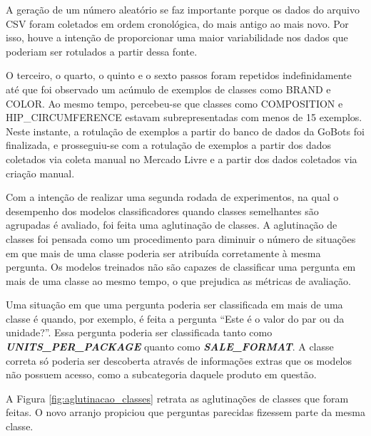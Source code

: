 A geração de um número aleatório se faz importante porque os dados do arquivo CSV foram coletados em ordem cronológica, do mais antigo ao mais novo. Por isso, houve a intenção de proporcionar uma maior variabilidade nos dados que poderiam ser rotulados a partir dessa fonte.

O terceiro, o quarto, o quinto e o sexto passos foram repetidos indefinidamente até que foi observado um acúmulo de exemplos de classes como BRAND e COLOR. Ao mesmo tempo, percebeu-se que classes como COMPOSITION e HIP\_CIRCUMFERENCE estavam subrepresentadas com menos de 15 exemplos. Neste instante, a rotulação de exemplos a partir do banco de dados da GoBots foi finalizada, e prosseguiu-se com a rotulação de exemplos a partir dos dados coletados via coleta manual no Mercado Livre e a partir dos dados coletados via criação manual.

Com a intenção de realizar uma segunda rodada de experimentos, na qual o desempenho dos modelos classificadores quando classes semelhantes são agrupadas é avaliado, foi feita uma aglutinação de classes. A aglutinação de classes foi pensada como um procedimento para diminuir o número de situações em que mais de uma classe poderia ser atribuída corretamente à mesma pergunta. Os modelos treinados não são capazes de classificar uma pergunta em mais de uma classe ao mesmo tempo, o que prejudica as métricas de avaliação.

Uma situação em que uma pergunta poderia ser classificada em mais de uma classe é quando, por exemplo, é feita a pergunta ``Este é o valor do par ou da unidade?''. Essa pergunta poderia ser classificada tanto como \textbf{\textit{UNITS\_PER\_PACKAGE}} quanto como \textbf{\textit{SALE\_FORMAT}}. A classe correta só poderia ser descoberta através de informações extras que os modelos não possuem acesso, como a subcategoria daquele produto em questão.

A Figura \ref{fig:aglutinacao_classes} retrata as aglutinações de classes que foram feitas. O novo arranjo propiciou que perguntas parecidas fizessem parte da mesma classe.

